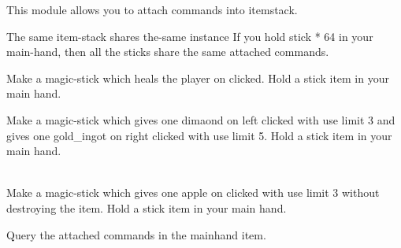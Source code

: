 
This module allows you to attach commands into itemstack.


\begin{note}{The same item-stack shares the-same instance}
    If you hold stick * 64 in your main-hand, then all the sticks share the same attached commands.
\end{note}

\begin{example}{Make a magic-stick which heals the player on clicked.}
    Hold a stick item in your main hand.\\
\end{example}

\begin{example}{Make a magic-stick which gives one dimaond on left clicked with use limit 3 and gives one gold\_ingot on right clicked with use limit 5.}
    Hold a stick item in your main hand.\\
    \\
\end{example}

\begin{example}{Make a magic-stick which gives one apple on clicked with use limit 3 without destroying the item.}
    Hold a stick item in your main hand.\\
\end{example}

\begin{example}{Query the attached commands in the mainhand item.}
\end{example}
